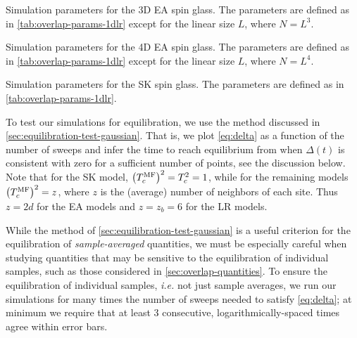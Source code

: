 \begin{table}
  \centering
  \caption[
    Simulation parameters for the three-dimensional Edwards-Anderson spin glass.
  ]
  {
    Simulation parameters for the 3D EA spin glass. The parameters are defined
    as in \cref{tab:overlap-params-1dlr} except for the linear size $L$, where
    $N=L^3$.
  }
  \label{tab:overlap-params-3d}
\end{table}

\begin{table}
  \centering
  \caption[
    Simulation parameters for the four-dimensional Edwards-Anderson spin glass.
  ]
  {
    Simulation parameters for the 4D EA spin glass. The parameters are defined
    as in \cref{tab:overlap-params-1dlr} except for the linear size $L$, where
    $N=L^4$.
  }
  \label{tab:overlap-params-4d}
\end{table}

\begin{table}
  \centering
  \caption[
    Simulation parameters for the Sherrington-Kirkpatrick spin glass.
  ]
  {
    Simulation parameters for the SK spin glass. The parameters are defined as
    in \cref{tab:overlap-params-1dlr}.
  }
  \label{tab:overlap-params-sk}
\end{table}

To test our simulations for equilibration, we use the method discussed in
\cref{sec:equilibration-test-gaussian}. That is, we plot \cref{eq:delta} as a
function of the number of sweeps and infer the time to reach equilibrium from
when $\Delta(t)$ is consistent with zero for a sufficient number of points, see
the discussion below. Note that for the SK model, $\left(T_c^{\mathrm{MF}}\right)^2=T_c^2=1$, while for
the remaining models $\left(T_c^{\mathrm{MF}}\right)^2=z$, where $z$ is the (average) number of
neighbors of each site. Thus $z=2d$ for the EA models and $z=z_b=6$ for the LR
models.

While the method of \cref{sec:equilibration-test-gaussian} is a useful
criterion for the equilibration of \emph{sample-averaged} quantities, we must
be especially careful when studying quantities that may be sensitive to the
equilibration of individual samples, such as those considered in
\cref{sec:overlap-quantities}. To ensure the equilibration of individual
samples, \emph{i.e.} not just sample averages, we run our simulations for many
times the number of sweeps needed to satisfy \cref{eq:delta}; at minimum we
require that at least 3 consecutive, logarithmically-spaced times agree within
error bars.

